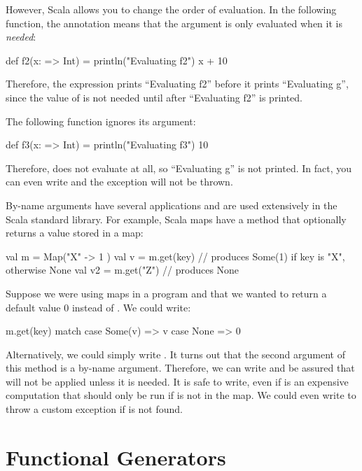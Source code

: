 \documentclass[9pt]{extbook}
\begin{document}
However, Scala allows you to change the order of evaluation.
In the following function, the \scalainline{=>} annotation means that the argument
is only evaluated when it is \emph{needed}:
\begin{scalacode}
def f2(x: => Int) = {
  println("Evaluating f2")
  x + 10
}
\end{scalacode}
Therefore, the expression  prints ``Evaluating f2'' before it prints
``Evaluating g'', since the value of  is not needed until after
``Evaluating f2'' is printed.

The following function ignores its argument:
\begin{scalacode}
def f3(x: => Int) = {
  println("Evaluating f3")
  10
}
\end{scalacode}

Therefore,  does not evaluate 
at all, so ``Evaluating g'' is not printed. In fact, you can even
write  and the exception
will not be thrown.

By-name arguments have several applications and are used extensively in the
Scala standard library. For example, Scala maps have a  method
that optionally returns a value stored in a map:
\begin{scalacode}
val m = Map("X" -> 1 )
val v = m.get(key) // produces Some(1) if key is "X", otherwise None
val v2 = m.get("Z") // produces None
\end{scalacode}
Suppose we were using maps in a program and that we wanted to return a default value 0
instead of . We could write:
\begin{scalacode}
m.get(key) match {
  case Some(v) => v
  case None => 0
}
\end{scalacode}
Alternatively, we could simply write . It turns out
that the second argument of this method is a by-name argument. Therefore, we can
write  and be assured that  will not
be applied unless it is needed. It is safe to write, even if  is
an expensive computation that should only be run if  is not
in the map. We could even write 
to throw a custom exception if  is not found.

\section{Functional Generators}
\end{document}

